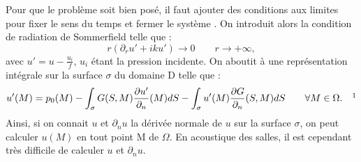 %
%
Pour que le problème soit bien posé, il faut ajouter des conditions aux limites pour fixer le sens du temps et fermer le système \cite[p. 92]{BEM}. On introduit alors la condition de radiation de Sommerfield telle que :
\begin{equation}
r(\partial_ru' + iku') \to 0 \qquad r \to +\infty,
\end{equation}
avec $u' = u - \frac{u_i}{f}$, $u_i$ étant la pression incidente. On aboutit à une représentation intégrale sur la surface $\sigma$ du domaine D telle que :
\begin{equation}
u'(M) = p_0(M) - \int_\sigma G(S,M) \frac{\partial u'}{\partial_n}(M)dS -  \int_\sigma u'(M) \frac{\partial G}{\partial_n}(S,M) dS	 	\qquad  \forall M  \in \Omega.
\ \ \ \footnotemark
\end{equation}
%
Ainsi, si on connait $u$ et $\partial_n u $ la dérivée normale de $u$ sur la surface $\sigma$, on peut calculer $u(M)$ en tout point M de $\Omega$. En acoustique des salles, il est cependant très difficile de calculer $u$ et $\partial_n u $.

